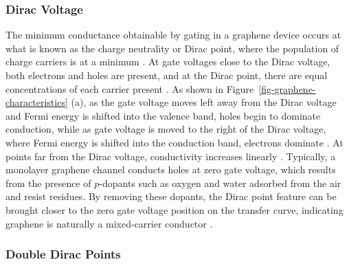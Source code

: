 \documentclass[
  a4paper,
]{scrbook}
\begin{document}
\hypertarget{dirac-voltage}{%
\subsubsection*{Dirac Voltage}\label{dirac-voltage}}

The minimum conductance obtainable by gating in a graphene device occurs
at what is known as the charge neutrality or Dirac point, where the
population of charge carriers is at a minimum
\autocite{Novoselov2004,Bartolomeo2011,Ohno2015,Kireev2017}. At gate
voltages close to the Dirac voltage, both electrons and holes are
present, and at the Dirac point, there are equal concentrations of each
carrier present \autocite{Novoselov2004,Bartolomeo2011,Peng2018}. As
shown in Figure~\ref{fig-graphene-characteristics} (a), as the gate
voltage moves left away from the Dirac voltage and Fermi energy is
shifted into the valence band, holes begin to dominate conduction, while
as gate voltage is moved to the right of the Dirac voltage, where Fermi
energy is shifted into the conduction band, electrons dominate
\autocite{Novoselov2004,Bartolomeo2011,Feng2014,Zhang2015}. At points
far from the Dirac voltage, conductivity increases linearly
\autocite{Novoselov2004,Bartolomeo2011,Peng2018}. Typically, a monolayer
graphene channel conducts holes at zero gate voltage, which results from
the presence of \(p\)-dopants such as oxygen and water adsorbed from the
air and resist residues. By removing these dopants, the Dirac point
feature can be brought closer to the zero gate voltage position on the
transfer curve, indicating graphene is naturally a mixed-carrier
conductor
\autocite{Novoselov2004,Bartolomeo2011,Zhang2015,Kireev2017,Peng2018}.

\hypertarget{double-dirac-points}{%
\subsubsection*{Double Dirac Points}\label{double-dirac-points}}
\end{document}

